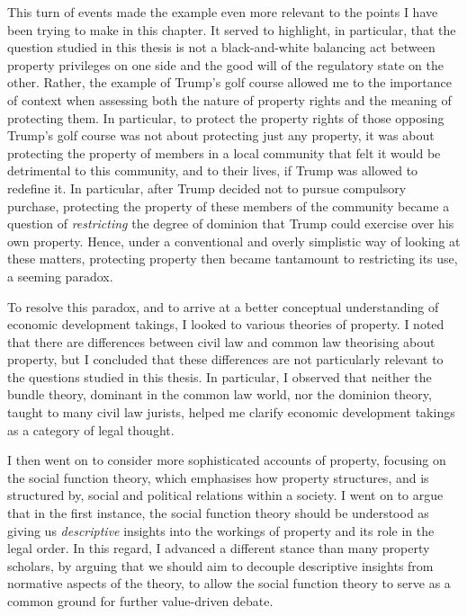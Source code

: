 This turn of events made the example even more relevant to the points I have been trying to make in this chapter. It served to highlight, in particular, that the question studied in this thesis is not a black-and-white balancing act between property privileges on one side and the good will of the regulatory state on the other. Rather, the example of Trump's golf course allowed me to  the importance of context when assessing both the nature of property rights and the meaning of protecting them. In particular, to protect the property rights of those opposing Trump's golf course was not about protecting just any property, it was about protecting the property of members in a local community that felt it would be detrimental to this community, and to their lives, if Trump was allowed to redefine it. In particular, after Trump decided not to pursue compulsory purchase, protecting the property of these members of the community became a question of {\it restricting} the degree of dominion that Trump could exercise over his own property. Hence, under a conventional and overly simplistic way of looking at these matters, protecting property then became tantamount to restricting its use, a seeming paradox.

To resolve this paradox, and to arrive at a better conceptual understanding of economic development takings, I looked to various theories of property. I noted that there are differences between civil law and common law theorising about property, but I concluded that these differences are not particularly relevant to the questions studied in this thesis. In particular, I observed that neither the bundle theory, dominant in the common law world, nor the dominion theory, taught to many civil law jurists, helped me clarify economic development takings as a category of legal thought.

I then went on to consider more sophisticated accounts of property, focusing on the social function theory, which emphasises how property structures, and is structured by, social and political relations within a society. I went on to argue that in the first instance, the social function theory should be understood as giving us {\it descriptive} insights into the workings of property and its role in the legal order. In this regard, I advanced a different stance than many property scholars, by arguing that we should aim to decouple descriptive insights from normative aspects of the theory, to allow the social function theory to serve as a common ground for further value-driven debate.

